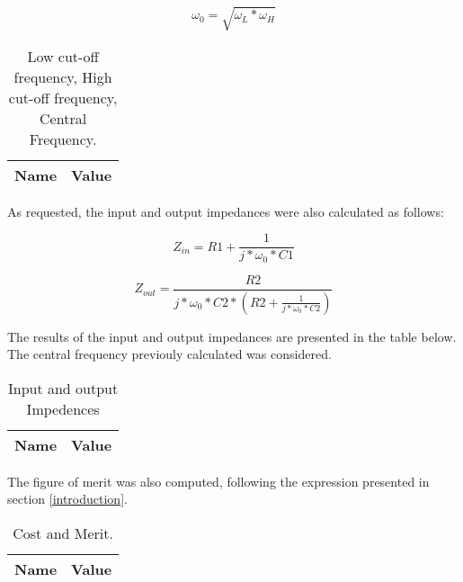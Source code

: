 \begin{equation}
\omega_{0}= \sqrt{\omega_{L} * \omega_{H}}
\end{equation}



\begin{table}[ht]
  \centering
  \begin{tabular}{|l|r|}
    \hline    
    {\bf Name} & {\bf Value} \\ \hline
    
  \end{tabular}
  \caption{Low cut-off frequency, High cut-off frequency, Central Frequency.}
\end{table}


As requested, the input and output impedances were also calculated as follows:

\begin{equation}
Z_{in}= R1+ \frac{1}{j*\omega_{0}*C1} 
\end{equation}

\begin{equation}
Z_{out}= \frac{R2}{j*\omega_{0}*C2*(R2+\frac{1}{j*\omega_{0}*C2})} 
\end{equation}

The results of the input and output impedances are presented in the table below. The central frequency previouly calculated was considered.

\begin{table}[ht]
  \centering
  \begin{tabular}{|l|r|}
    \hline    
    {\bf Name} & {\bf Value} \\ \hline
    
  \end{tabular}
  \caption{Input and output Impedences}
  \label{tab:2}
\end{table}


The figure of merit was also computed, following the expression presented in section \ref{introduction}.

\begin{table}[ht]
  \centering
  \begin{tabular}{|l|r|}
    \hline    
    {\bf Name} & {\bf Value} \\ \hline
    
  \end{tabular}
  \caption{Cost and Merit.}
\end{table}



